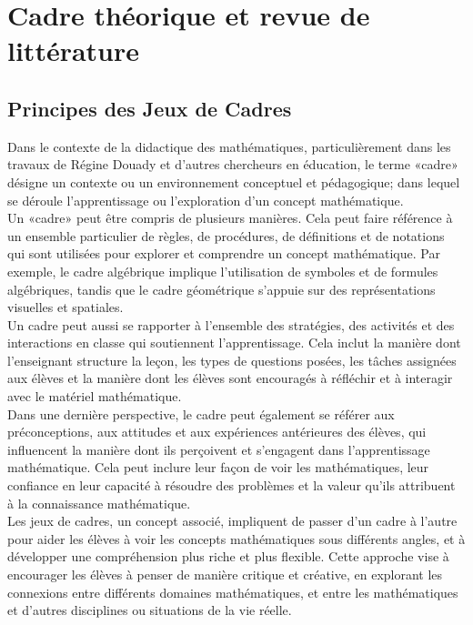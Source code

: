 \section{Cadre théorique et revue de littérature}
\subsection{Principes des Jeux de Cadres}

Dans le contexte de la didactique des mathématiques,
particulièrement dans les travaux de Régine Douady et d'autres chercheurs en éducation,
le terme «cadre» désigne un contexte ou un environnement conceptuel et pédagogique;
dans lequel se déroule l'apprentissage ou l'exploration d'un concept mathématique.\\

Un «cadre» peut être compris de plusieurs manières.
Cela peut faire référence à un ensemble particulier de règles,
de procédures,
de définitions et de notations qui sont utilisées pour explorer et comprendre un concept mathématique.
Par exemple,
le cadre algébrique implique l'utilisation de symboles et de formules algébriques,
tandis que le cadre géométrique s'appuie sur des représentations visuelles et spatiales.\\

Un cadre peut aussi se rapporter à l'ensemble des stratégies,
des activités et des interactions en classe qui soutiennent l'apprentissage.
Cela inclut la manière dont l'enseignant structure la leçon,
les types de questions posées,
les tâches assignées aux élèves et la manière dont les élèves sont encouragés à réfléchir et à interagir avec le matériel mathématique.\\

Dans une dernière perspective,
le cadre peut également se référer aux préconceptions,
aux attitudes et aux expériences antérieures des élèves,
qui influencent la manière dont ils perçoivent et s'engagent dans l'apprentissage mathématique.
Cela peut inclure leur façon de voir les mathématiques,
leur confiance en leur capacité à résoudre des problèmes et la valeur qu'ils attribuent à la connaissance mathématique.\\

Les jeux de cadres,
un concept associé,
impliquent de passer d'un cadre à l'autre pour aider les élèves à voir les concepts mathématiques sous différents angles,
et à développer une compréhension plus riche et plus flexible.
Cette approche vise à encourager les élèves à penser de manière critique et créative,
en explorant les connexions entre différents domaines mathématiques,
et entre les mathématiques et d'autres disciplines ou situations de la vie réelle.

